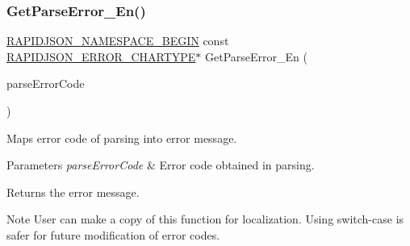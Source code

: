 \subsubsection{\texorpdfstring{Get\+Parse\+Error\+\_\+\+En()}{GetParseError\_En()}}
{\footnotesize\ttfamily \hyperlink{group___r_a_p_i_d_j_s_o_n___c_o_n_f_i_g_gad3806c8251fdc7da9618b7e922674ffc}{R\+A\+P\+I\+D\+J\+S\+O\+N\+\_\+\+N\+A\+M\+E\+S\+P\+A\+C\+E\+\_\+\+B\+E\+G\+IN} const \hyperlink{group___r_a_p_i_d_j_s_o_n___e_r_r_o_r_s_ga7e4636fd48d0148f102b8a13f0539d8c}{R\+A\+P\+I\+D\+J\+S\+O\+N\+\_\+\+E\+R\+R\+O\+R\+\_\+\+C\+H\+A\+R\+T\+Y\+PE}$\ast$ Get\+Parse\+Error\+\_\+\+En (\begin{DoxyParamCaption}\item[{\hyperlink{group___r_a_p_i_d_j_s_o_n___e_r_r_o_r_s_ga8d4b32dfc45840bca189ade2bbcb6ba7}{Parse\+Error\+Code}}]{parse\+Error\+Code }\end{DoxyParamCaption})\hspace{0.3cm}{\ttfamily [inline]}}



Maps error code of parsing into error message. 


\begin{DoxyParams}{Parameters}
{\em parse\+Error\+Code} & Error code obtained in parsing. \\
\hline
\end{DoxyParams}
\begin{DoxyReturn}{Returns}
the error message. 
\end{DoxyReturn}
\begin{DoxyNote}{Note}
User can make a copy of this function for localization. Using switch-\/case is safer for future modification of error codes. 
\end{DoxyNote}
